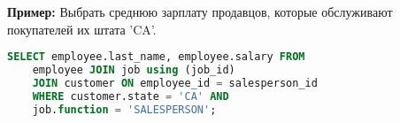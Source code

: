 \textbf{Пример:} Выбрать среднюю зарплату продавцов, которые обслуживают покупателей их штата 'CA'.
\begin{lstlisting}[language=SQL]
    SELECT employee.last_name, employee.salary FROM 
    employee JOIN job using (job_id)
    JOIN customer ON employee_id = salesperson_id 
    WHERE customer.state = 'CA' AND 
    job.function = 'SALESPERSON';
\end{lstlisting}


